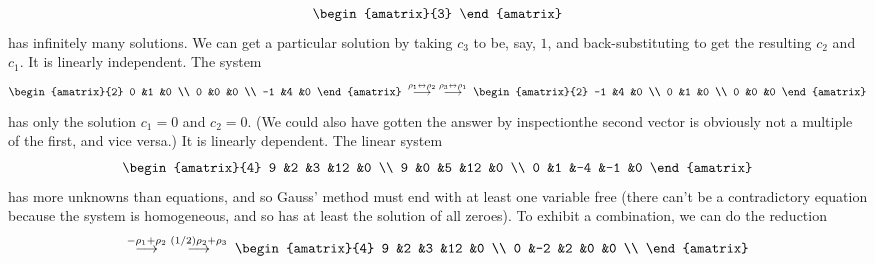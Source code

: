 \begin{exercises}
\begin{answer}
\begin{exparts}
\begin{equation*}
\begin{amatrix}{3}
            \end{amatrix}
          \end{equation*}
          has infinitely many solutions.
          We can get a particular solution by taking $c_3$ to be, say,
          $1$, and back-substituting to get the resulting $c_2$ and $c_1$.
        \partsitem It is linearly independent.
          The system
          \begin{equation*}
            \begin{amatrix}{2}
              0  &1  &0  \\
              0  &0  &0  \\
              -1 &4  &0
            \end{amatrix}
            \;\grstep{\rho_1\leftrightarrow\rho_2}
            \;\grstep{\rho_3\leftrightarrow\rho_1}\;
            \begin{amatrix}{2}
              -1 &4  &0  \\
              0  &1  &0  \\
              0  &0  &0  
            \end{amatrix}
          \end{equation*}
          has only the solution $c_1=0$ and $c_2=0$.
          (We could also have gotten the answer by inspection\Dash the second
          vector is obviously not a multiple of the first, and vice versa.)
        \partsitem It is linearly dependent.
          The linear system
          \begin{equation*}
            \begin{amatrix}{4}
              9  &2  &3  &12  &0  \\
              9  &0  &5  &12  &0  \\
              0  &1  &-4 &-1  &0
            \end{amatrix}
          \end{equation*}
          has more unknowns than equations, and so Gauss' method
          must end with at least one variable free (there can't be a 
          contradictory equation because the system is homogeneous, and so
          has at least the solution of all zeroes).
          To exhibit a combination, we can do the reduction 
          \begin{equation*}
            \grstep{-\rho_1+\rho_2}
            \;\grstep{(1/2)\rho_2+\rho_3}\;
            \begin{amatrix}{4}
              9  &2  &3  &12  &0  \\
              0  &-2 &2  &0   &0  \\

\end{amatrix}
\end{equation*}
\end{exparts}
\end{answer}
\end{exercises}
